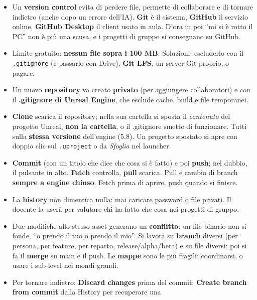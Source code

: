\begin{itemize}
  \item Un \textbf{version control} evita di perdere file, permette di
        collaborare e di tornare indietro (anche dopo un errore dell'IA).
        \textbf{Git} è il sistema, \textbf{GitHub} il servizio online,
        \textbf{GitHub Desktop} il client usato in aula. D'ora in poi ``mi si
        è rotto il PC'' non è più una scusa, e i progetti di gruppo si
        consegnano su GitHub.
  \item Limite gratuito: \textbf{nessun file sopra i 100 MB}. Soluzioni:
        escluderlo con il \texttt{.gitignore} (e passarlo con Drive),
        \textbf{Git LFS}, un server Git proprio, o pagare.
  \item Un nuovo \textbf{repository} va creato \textbf{privato} (per aggiungere
        collaboratori) e con il \textbf{.gitignore di Unreal Engine}, che esclude
        cache, build e file temporanei.
  \item \textbf{Clone} scarica il repository; nella sua cartella si sposta il
        \emph{contenuto} del progetto Unreal, \textbf{non la cartella}, o il
        .gitignore smette di funzionare. Tutti sulla \textbf{stessa versione}
        dell'engine (5.8). Un progetto spostato si apre con doppio clic sul
        \texttt{.uproject} o da \emph{Sfoglia} nel launcher.
  \item \textbf{Commit} (con un titolo che dice che cosa si è fatto) e poi
        \textbf{push}; nel dubbio, il pulsante in alto. \textbf{Fetch}
        controlla, \textbf{pull} scarica. Pull e cambio di branch \textbf{sempre
        a engine chiuso}. Fetch prima di aprire, push quando si finisce.
  \item La \textbf{history} non dimentica nulla: mai caricare password o file
        privati. Il docente la userà per valutare chi ha fatto che cosa nei
        progetti di gruppo.
  \item Due modifiche allo stesso asset generano un \textbf{conflitto}: un file
        binario non si fonde, ``o prendo il tuo o prendo il mio''. Si lavora su
        \textbf{branch} diversi (per persona, per feature, per reparto,
        release/alpha/beta) e su file diversi; poi si fa il \textbf{merge} su
        main e il push. Le \textbf{mappe} sono le più fragili: coordinarsi, o
        usare i sub-level nei mondi grandi.
  \item Per tornare indietro: \textbf{Discard changes} prima del commit;
        \textbf{Create branch from commit} dalla History per recuperare una

\end{itemize}

